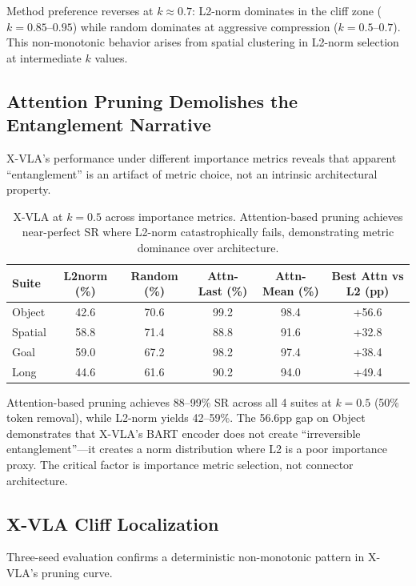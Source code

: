 \documentclass[letterpaper]{article}
\begin{document}
Method preference reverses at $k \approx 0.7$: L2-norm dominates in the cliff zone ($k=0.85$--$0.95$) while random dominates at aggressive compression ($k=0.5$--$0.7$).
This non-monotonic behavior arises from spatial clustering in L2-norm selection at intermediate $k$ values.

\subsection{Attention Pruning Demolishes the Entanglement Narrative}

X-VLA's performance under different importance metrics reveals that apparent ``entanglement'' is an artifact of metric choice, not an intrinsic architectural property.

\begin{table}[h]
\centering
\caption{X-VLA at $k=0.5$ across importance metrics. Attention-based pruning achieves near-perfect SR where L2-norm catastrophically fails, demonstrating metric dominance over architecture.}
\label{tab:attention_pruning}
\begin{tabular}{lccccc}
\toprule
Suite & L2norm (\%) & Random (\%) & Attn-Last (\%) & Attn-Mean (\%) & Best Attn vs L2 (pp) \\
\midrule
Object & 42.6 & 70.6 & 99.2 & 98.4 & +56.6 \\
Spatial & 58.8 & 71.4 & 88.8 & 91.6 & +32.8 \\
Goal & 59.0 & 67.2 & 98.2 & 97.4 & +38.4 \\
Long & 44.6 & 61.6 & 90.2 & 94.0 & +49.4 \\
\bottomrule
\end{tabular}
\end{table}

Attention-based pruning achieves 88--99\% SR across all 4 suites at $k=0.5$ (50\% token removal), while L2-norm yields 42--59\%.
The 56.6pp gap on Object demonstrates that X-VLA's BART encoder does not create ``irreversible entanglement''---it creates a norm distribution where L2 is a poor importance proxy.
The critical factor is importance metric selection, not connector architecture.

\subsection{X-VLA Cliff Localization}

Three-seed evaluation confirms a deterministic non-monotonic pattern in X-VLA's pruning curve.
\end{document}
